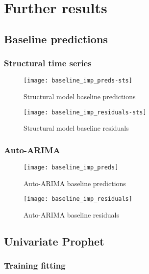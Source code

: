 \chapter{Further results}
\label{cha:App-A}

\section{Baseline predictions}

\subsection{Structural time series}
\label{app:structts_preds}
\begin{figure}[H]
	\centering
	\texttt{[image: baseline\_imp\_preds-sts]}
	\caption{Structural model baseline predictions}
	\label{fig:base_sts_preds}
\end{figure}

\begin{figure}[H]
	\centering
	\texttt{[image: baseline\_imp\_residuals-sts]}
	\caption{Structural model baseline residuals}
	\label{fig:base_sts_res}
\end{figure}

\subsection{Auto-ARIMA}
\label{app:arima_preds}
\begin{figure}[H]
	\centering
	\texttt{[image: baseline\_imp\_preds]}
	\caption{Auto-ARIMA baseline predictions}
	\label{fig:base_arima_preds}
\end{figure}

\begin{figure}[H]
	\centering
	\texttt{[image: baseline\_imp\_residuals]}
	\caption{Auto-ARIMA baseline residuals}
	\label{fig:base_arima_res}
\end{figure}






\section{Univariate Prophet}
\label{app:uniprophet}


\subsection{Training fitting}

